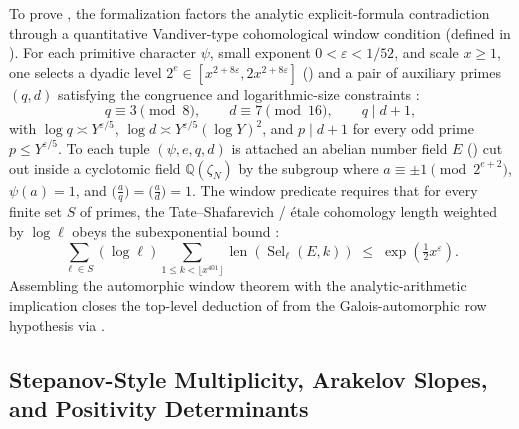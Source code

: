 To prove , the formalization factors the
analytic explicit-formula contradiction through a quantitative Vandiver-type
cohomological window condition  (defined in
).
For each primitive character $\psi$, small exponent $0 < \varepsilon < 1/52$,
and scale $x \ge 1$, one selects a dyadic level $2^e \in [x^{2 + 8\varepsilon},
2 x^{2 + 8\varepsilon}]$ () and a pair of
auxiliary primes $(q, d)$ satisfying the congruence and logarithmic-size
constraints :
\[
  q \equiv 3 \pmod{8}, \qquad d \equiv 7 \pmod{16}, \qquad q \mid d + 1,
\]
with $\log q \asymp Y^{\varepsilon/5}$,
$\log d \asymp Y^{\varepsilon/5}(\log Y)^2$, and $p \mid d + 1$ for every odd
prime $p \le Y^{\varepsilon/5}$.
To each tuple $(\psi, e, q, d)$ is attached an abelian number field $E$
() cut out inside a cyclotomic field
$\mathbb{Q}(\zeta_N)$ by the subgroup where $a \equiv \pm 1 \pmod{2^{e+2}}$,
$\psi(a) = 1$, and $\bigl(\frac{a}{q}\bigr) = \bigl(\frac{a}{d}\bigr) = 1$.
The window predicate  requires that for every
finite set $S$ of primes, the Tate--Shafarevich / étale cohomology length
weighted by $\log \ell$ obeys the subexponential bound
:
\[
  \sum_{\ell \in S} (\log \ell) \sum_{1 \le k < \lfloor x^{401} \rfloor}
    \operatorname{len}\!\left(\operatorname{Sel}_\ell(E, k)\right)
  \;\le\;
  \exp\!\left(\tfrac{1}{2} x^{\varepsilon}\right).
\]
Assembling the automorphic window theorem 
with the analytic-arithmetic implication
closes the top-level deduction of  from
the Galois-automorphic row hypothesis 
via .

\subsection{Stepanov-Style Multiplicity, Arakelov Slopes, and Positivity Determinants}
\label{subsec:ch02-slopes-determinants}

